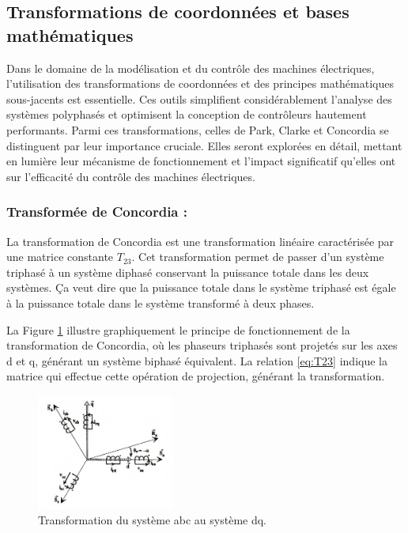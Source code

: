 \FloatBarrier
\subsection{Transformations de coordonnées et bases mathématiques}
\FloatBarrier

Dans le domaine de la modélisation et du contrôle des machines électriques, l'utilisation des transformations de coordonnées et des principes mathématiques sous-jacents est essentielle. Ces outils simplifient considérablement l'analyse des systèmes polyphasés et optimisent la conception de contrôleurs hautement performants. Parmi ces transformations, celles de Park, Clarke et Concordia se distinguent par leur importance cruciale. Elles seront explorées en détail, mettant en lumière leur mécanisme de fonctionnement et l'impact significatif qu'elles ont sur l'efficacité du contrôle des machines électriques.

\FloatBarrier
\subsubsection{Transformée de Concordia :}
\FloatBarrier

La transformation de Concordia est une transformation linéaire caractérisée par une matrice constante $T_{23}$. Cet transformation permet de passer d'un système triphasé à un système diphasé conservant la puissance totale dans les deux systèmes. Ça veut dire que la puissance totale dans le système triphasé est égale à la puissance totale dans le système transformé à deux phases. 

La Figure \ref{img-abc_dq} illustre graphiquement le principe de fonctionnement de la transformation de Concordia, où les phaseurs triphasés sont projetés sur les axes d et q, générant un système biphasé équivalent. La relation \ref{eq:T23} indique la matrice qui effectue cette opération de projection, générant la transformation. 

\begin{figure}[!h]
    \centering
    \includegraphics[width=0.4\textwidth]{book_imgs/abc_dq.png} 
    \caption{Transformation du système abc au système dq.}
    \label{img-abc_dq}
\end{figure}

